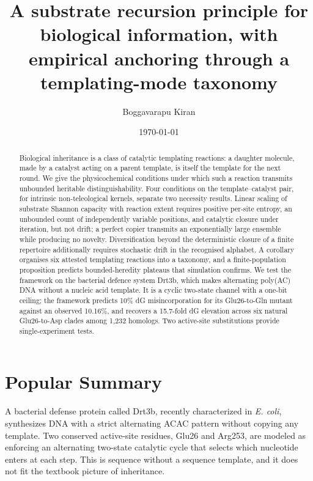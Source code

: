 \documentclass[aps,prx,reprint,amsmath,amssymb,floatfix,superscriptaddress,nofootinbib]{revtex4-2}
\theoremstyle{plain-thm}
\theoremstyle{definition-thm}
\begin{document}
\title{A substrate recursion principle for biological information, with empirical anchoring through a templating-mode taxonomy}

\author{Boggavarapu Kiran}

\date{\today}

\begin{abstract}
Biological inheritance is a class of catalytic templating reactions: a daughter molecule, made by a catalyst acting on a parent template, is itself the template for the next round. We give the physicochemical conditions under which such a reaction transmits unbounded heritable distinguishability. Four conditions on the template--catalyst pair, for intrinsic non-teleological kernels, separate two necessity results. Linear scaling of substrate Shannon capacity with reaction extent requires positive per-site entropy, an unbounded count of independently variable positions, and catalytic closure under iteration, but not drift; a perfect copier transmits an exponentially large ensemble while producing no novelty. Diversification beyond the deterministic closure of a finite repertoire additionally requires stochastic drift in the recognised alphabet. A corollary organises six attested templating reactions into a taxonomy, and a finite-population proposition predicts bounded-heredity plateaus that simulation confirms. We test the framework on the bacterial defence system Drt3b, which makes alternating poly(AC) DNA without a nucleic acid template. It is a cyclic two-state channel with a one-bit ceiling; the framework predicts 10\% dG misincorporation for its Glu26-to-Gln mutant against an observed 10.16\%, and recovers a 15.7-fold dG elevation across six natural Glu26-to-Asp clades among 1{,}232 homologs. Two active-site substitutions provide single-experiment tests.
\end{abstract}

\maketitle

\section*{Popular Summary}

A bacterial defense protein called Drt3b, recently characterized in \emph{E. coli}, synthesizes DNA with a strict alternating ACAC pattern without copying any template. Two conserved active-site residues, Glu26 and Arg253, are modeled as enforcing an alternating two-state catalytic cycle that selects which nucleotide enters at each step. This is sequence without a sequence template, and it does not fit the textbook picture of inheritance.
\end{document}
